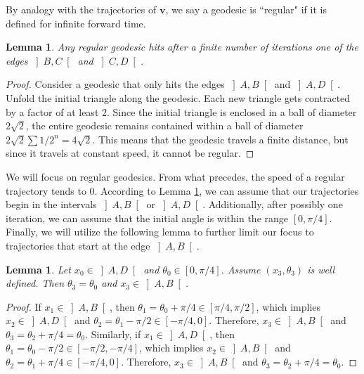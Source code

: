 \documentclass[11pt]{article}
\newtheorem{lemma}[thm]{Lemma}
\begin{document}
By analogy with the trajectories of $\mathbf{v}$, we say a geodesic is ``regular" if it is defined for infinite forward time.

\begin{lemma}
\label{RestrictABAD}
    Any regular geodesic hits after a finite number of iterations one of the edges $\left]B,C\right[$ and $\left]C,D\right[$.
\end{lemma}

\begin{proof}
    Consider a geodesic that only hits the edges $\left]A,B\right[$ and $\left]A,D\right[$. Unfold the initial triangle along the geodesic. Each new triangle gets contracted by a factor of at least $2$. Since the initial triangle is enclosed in a ball of diameter $2\sqrt{2}$, the entire geodesic remains contained within a ball of diameter $2\sqrt{2}\sum1/2^{n}=4\sqrt{2}$. This means that the geodesic travels a finite distance, but since it travels at constant speed, it cannot be regular.
\end{proof}

 We will focus on regular geodesics. From what precedes, the speed of a regular trajectory tends to 0. According to Lemma \ref{RestrictABAD}, we can assume that our trajectories begin in the intervals $\left]A,B\right[$ or $\left]A,D\right[$. Additionally, after possibly one iteration, we can assume that the initial angle is within the range $\left[0,\pi/4\right]$. Finally, we will utilize the following lemma to further limit our focus to trajectories that start at the edge $\left]A,B\right[$.

\begin{lemma}
\label{RestrictAB}
    Let $x_{0}\in\left]A,D\right[$ and $\theta_{0}\in\left[0,\pi/4\right]$. Assume $\left(x_{3},\theta_{3}\right)$ is well defined. Then $\theta_{3}=\theta_{0}$ and $x_{3}\in\left]A,B\right[$.
\end{lemma}

\begin{proof}
    If $x_{1}\in\left]A,B\right[$, then $\theta_{1}=\theta_{0}+\pi/4\in\left[\pi/4,\pi/2\right]$, which implies $x_{2}\in\left]A,D\right[$ and $\theta_{2}=\theta_{1}-\pi/2\in\left[-\pi/4,0\right]$. Therefore, $x_{3}\in\left]A,B\right[$ and $\theta_{3}=\theta_{2}+\pi/4=\theta_{0}$. Similarly, if $x_{1}\in\left]A,D\right[$, then $\theta_{1}=\theta_{0}-\pi/2\in\left[-\pi/2,-\pi/4\right]$, which implies $x_{2}\in\left]A,B\right[$ and $\theta_{2}=\theta_{1}+\pi/4\in\left[-\pi/4,0\right]$. Therefore, $x_{3}\in\left]A,B\right[$ and $\theta_{3}=\theta_{2}+\pi/4=\theta_{0}$.
\end{proof}
\end{document}
